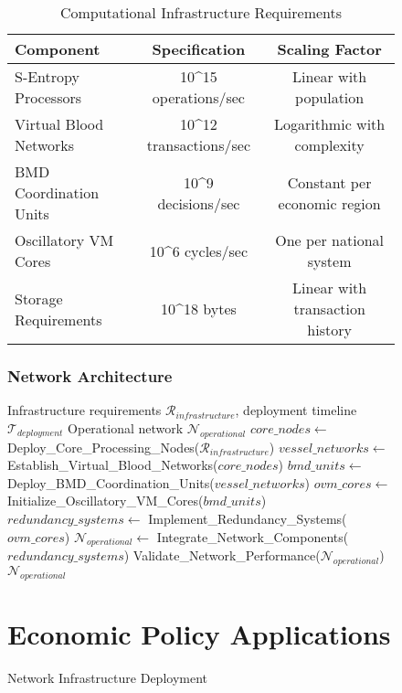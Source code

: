 \begin{figure}[h]
    \begin{table}[h]
    \centering
    \caption{Computational Infrastructure Requirements}
    \begin{tabular}{@{}lcc@{}}
    \toprule
    \textbf{Component} & \textbf{Specification} & \textbf{Scaling Factor} \\
    \midrule
    S-Entropy Processors & 10^{15} operations/sec & Linear with population \\
    Virtual Blood Networks & 10^{12} transactions/sec & Logarithmic with complexity \\
    BMD Coordination Units & 10^{9} decisions/sec & Constant per economic region \\
    Oscillatory VM Cores & 10^{6} cycles/sec & One per national system \\
    Storage Requirements & 10^{18} bytes & Linear with transaction history \\
    \bottomrule
    \end{tabular}
    \end{table}
    
    \subsubsection{Network Architecture}
    
    \begin{algorithm}
    \caption{Network Infrastructure Deployment}
    \begin{algorithmic}[1]
    \REQUIRE Infrastructure requirements $\mathcal{R}_{infrastructure}$, deployment timeline $\mathcal{T}_{deployment}$
    \ENSURE Operational network $\mathcal{N}_{operational}$
    \STATE $core\_nodes \leftarrow$ Deploy\_Core\_Processing\_Nodes($\mathcal{R}_{infrastructure}$)
    \STATE $vessel\_networks \leftarrow$ Establish\_Virtual\_Blood\_Networks($core\_nodes$)
    \STATE $bmd\_units \leftarrow$ Deploy\_BMD\_Coordination\_Units($vessel\_networks$)
    \STATE $ovm\_cores \leftarrow$ Initialize\_Oscillatory\_VM\_Cores($bmd\_units$)
    \STATE $redundancy\_systems \leftarrow$ Implement\_Redundancy\_Systems($ovm\_cores$)
    \STATE $\mathcal{N}_{operational} \leftarrow$ Integrate\_Network\_Components($redundancy\_systems$)
    \STATE Validate\_Network\_Performance($\mathcal{N}_{operational}$)
    \RETURN $\mathcal{N}_{operational}$
    \end{algorithmic}
    \end{algorithm}
    
    \section{Economic Policy Applications}
    

\end{figure}
